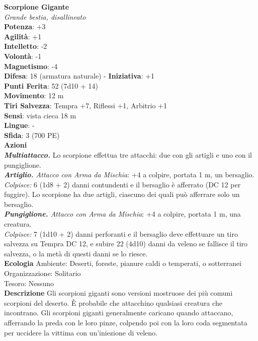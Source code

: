 \begin{multicols}{2}
\medskip\textbf{Scorpione Gigante}\\
\emph{Grande bestia, disallineato}\\
\textbf{Potenza}: +3\\
\textbf{Agilità}: +1\\
\textbf{Intelletto}: -2\\
\textbf{Volontà}: -1\\
\textbf{Magnetismo}: -4\\
\textbf{Difesa}: 18 (armatura naturale) - \textbf{Iniziativa}: +1\\
\textbf{Punti Ferita}: 52 (7d10 + 14)\\
\textbf{Movimento}: 12 m\\
\textbf{Tiri Salvezza}: Tempra +7, Riflessi +1, Arbitrio +1\\
\textbf{Sensi}: vista cieca 18 m\\
\textbf{Lingue}: -\\
\textbf{Sfida}: 3 (700 PE)\smallskip\\
\smallskip\textbf{Azioni}\\
\emph{\textbf{Multiattacco.}} Lo scorpione effettua tre attacchi: due con gli artigli e uno con il pungiglione.\\
\emph{\textbf{Artiglio.} Attacco con Arma da Mischia}: +4 a colpire, portata 1 m, un bersaglio.\\
\emph{Colpisce:} 6 (1d8 + 2) danni contundenti e il bersaglio è afferrato (DC 12 per fuggire). Lo scorpione ha due artigli, ciascuno dei quali può afferrare solo un bersaglio.\\
\emph{\textbf{Pungiglione.} Attacco con Arma da Mischia}: +4 a colpire, portata 1 m, una creatura.\\
\emph{Colpisce:} 7 (1d10 + 2) danni perforanti e il bersaglio deve effettuare un tiro salvezza su Tempra DC 12, e subire 22 (4d10) danni da veleno se fallisce il tiro salvezza, o la metà di questi danni se lo riesce.\\
\textbf{Ecologia}
Ambiente: Deserti, foreste, pianure caldi o temperati, o sotterranei\\
Organizzazione: Solitario\\
Tesoro: Nessuno\\
\textbf{Descrizione}
Gli scorpioni giganti sono versioni mostruose dei più comuni scorpioni del deserto. È probabile che attacchino qualsiasi creatura che incontrano. Gli scorpioni giganti generalmente caricano quando attaccano, afferrando la preda con le loro pinze, colpendo poi con la loro coda segmentata per uccidere la vittima con un’iniezione di veleno.\\


\end{multicols}
